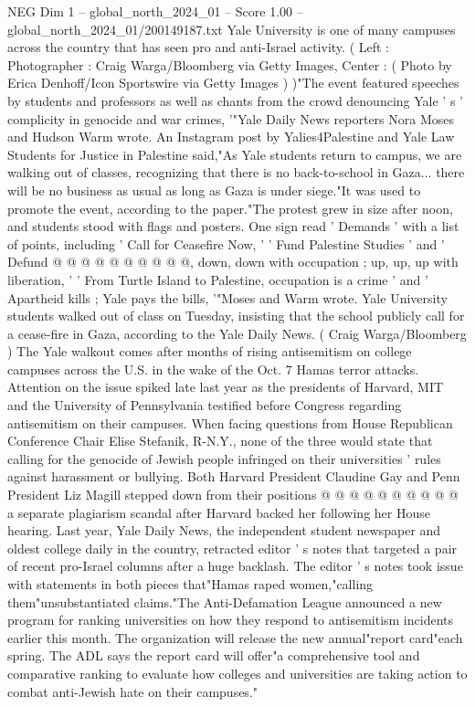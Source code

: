 \begin{textsample}{NEG Dim 1 – global\_north\_2024\_01 – Score 1.00 – global\_north\_2024\_01/200149187.txt}  \label{ex:f1_neg_295}
Yale University is one of many campuses across the country that has seen pro and anti-Israel activity. ( Left : Photographer : Craig Warga/Bloomberg via Getty Images, Center : ( Photo by Erica Denhoff/Icon Sportswire via Getty Images ) )"The event featured speeches by students and professors as well as chants from the crowd denouncing Yale ' s ' complicity in genocide and war crimes, '"Yale Daily News reporters Nora Moses and Hudson Warm wrote.
An Instagram post by Yalies4Palestine and Yale Law Students for Justice in Palestine said,"As Yale students return to campus, we are walking out of classes, recognizing that there is no back-to-school in Gaza... there will be no business as usual as long as Gaza is under siege."It was used to promote the event, according to the paper."The protest grew in size after noon, and students stood with flags and posters.
One sign read ' Demands ' with a list of points, including ' Call for Ceasefire Now, ' ' Fund Palestine Studies ' and ' Defund @ @ @ @ @ @ @ @ @ @, down, down with occupation ; up, up, up with liberation, ' ' From Turtle Island to Palestine, occupation is a crime ' and ' Apartheid kills ; Yale pays the bills, '"Moses and Warm wrote.
Yale University students walked out of class on Tuesday, insisting that the school publicly call for a cease-fire in Gaza, according to the Yale Daily News. ( Craig Warga/Bloomberg ) The Yale walkout comes after months of rising antisemitism on college campuses across the U.S. in the wake of the Oct. 7 Hamas terror attacks.
Attention on the issue spiked late last year as the presidents of Harvard, MIT and the University of Pennsylvania testified before Congress regarding antisemitism on their campuses.
When facing questions from House Republican Conference Chair Elise Stefanik, R-N.Y., none of the three would state that calling for the genocide of Jewish people infringed on their universities ' rules against harassment or bullying.
Both Harvard President Claudine Gay and Penn President Liz Magill stepped down from their positions @ @ @ @ @ @ @ @ @ @ a separate plagiarism scandal after Harvard backed her following her House hearing.
Last year, Yale Daily News, the independent student newspaper and oldest college daily in the country, retracted editor ' s notes that targeted a pair of recent pro-Israel columns after a huge backlash.
The editor ' s notes took issue with statements in both pieces that"Hamas raped women,"calling them"unsubstantiated claims."The Anti-Defamation League announced a new program for ranking universities on how they respond to antisemitism incidents earlier this month.
The organization will release the new annual"report card"each spring.
The ADL says the report card will offer"a comprehensive tool and comparative ranking to evaluate how colleges and universities are taking action to combat anti-Jewish hate on their campuses."

\end{textsample}
